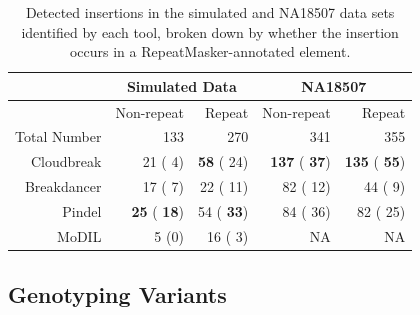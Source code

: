 \documentclass[11pt]{article}
\begin{document}
\begin{table}
\begin{center}
\begin{tabular}{rrr|rr}
 & \multicolumn{2}{c}{Simulated Data} & \multicolumn{2}{c}{NA18507} \\
\hline
 &  Non-repeat & Repeat  &  Non-repeat & Repeat \\ 
 Total Number & 133 & 270 & 341 & 355 \\ 
  \hline
  Cloudbreak  &  21 (  4) & \textbf{ 58} ( 24) & \textbf{137} (\textbf{ 37}) & \textbf{135} (\textbf{ 55}) \\ 
  Breakdancer &  17 (  7) &  22 ( 11) &  82 ( 12) &  44 (  9) \\
  Pindel      & \textbf{ 25} (\textbf{ 18}) &  54 (\textbf{ 33}) &  84 ( 36) &  82 ( 25) \\ 
  MoDIL      &   5 (0) &  16 (  3) & NA & NA \\ 
   \hline
\end{tabular}
\end{center}
\caption{Detected insertions in the simulated and NA18507 data sets identified by each tool, broken down by whether the insertion occurs in a RepeatMasker-annotated element.}
\label{insertionRepmaskpreds}
\end{table}

\subsection{Genotyping Variants}
\end{document}
